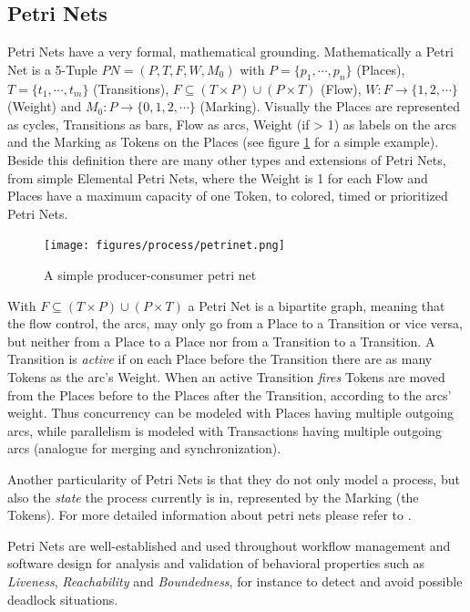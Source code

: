 \subsection{Petri Nets}

Petri Nets have a very formal, mathematical grounding. Mathematically a Petri Net is a 5-Tuple
$PN = (P,T,F,W,M_0)$ with 
$P = \{ p_1,\cdots,p_n \}$ (Places), 
$T = \{ t_1,\cdots,t_m \}$ (Transitions), 
$F \subseteq (T \times P) \cup (P \times T)$ (Flow), 
$W : F \rightarrow \{1,2,\cdots \}$ (Weight) and 
$M_0 : P \rightarrow \{0,1,2,\cdots \}$ (Marking). Visually the Places are represented as cycles, Transitions as bars, Flow as arcs, Weight (if > 1) as labels on the arcs and the Marking as Tokens on the Places (see figure \ref{fig:petrinet} for a simple example). Beside this definition there are many other types and extensions of Petri Nets, from simple Elemental Petri Nets, where the Weight is 1 for each Flow and Places have a maximum capacity of one Token, to colored, timed or prioritized Petri Nets.

\begin{figure}[htp]
	\centering
	\texttt{[image: figures/process/petrinet.png]}
	\caption{A simple producer-consumer petri net}
	\label{fig:petrinet}
\end{figure}

With $F \subseteq (T \times P) \cup (P \times T)$ a Petri Net is a bipartite graph, meaning that the flow control, the arcs, may only go from a Place to a Transition or vice versa, but neither from a Place to a Place nor from a Transition to a Transition.
A Transition is \emph{active} if on each Place before the Transition there are as many Tokens as the arc's Weight. When an active Transition \emph{fires} Tokens are moved from the Places before to the Places after the Transition, according to the arcs' weight. Thus concurrency can be modeled with Places having multiple outgoing arcs, while parallelism is modeled with Transactions having multiple outgoing arcs (analogue for merging and synchronization).

Another particularity of Petri Nets is that they do not only model a process, but also the \emph{state} the process currently is in, represented by the Marking (the Tokens). For more detailed information about petri nets please refer to \cite{Murata89}.

Petri Nets are well-established and used throughout workflow management and software design for analysis and validation of behavioral properties such as \emph{Liveness}, \emph{Reachability} and \emph{Boundedness}, for instance to detect and avoid possible deadlock situations.

